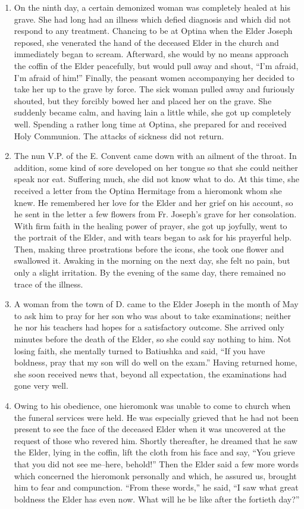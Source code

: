 \begin{enumerate}
\item On the ninth day, a certain demonized woman was completely healed at his grave. She had long had an illness which defied diagnosis and which did not respond to any treatment. Chancing to be at Optina when the Elder Joseph reposed, she venerated the hand of the deceased Elder in the church and immediately began to scream. Afterward, she would by no means approach the coffin of the Elder peacefully, but would pull away and shout, “I'm afraid, I'm afraid of him!” Finally, the peasant women accompanying her decided to take her up to the grave by force. The sick woman pulled away and furiously shouted, but they forcibly bowed her and placed her on the grave. She suddenly became calm, and having lain a little while, she got up completely well. Spending a rather long time at Optina, she prepared for and received Holy Communion. The attacks of sickness did not return.

\item The nun V.P. of the E. Convent came down with an ailment of the throat. In addition, some kind of sore developed on her tongue so that she could neither speak nor eat. Suffering much, she did not know what to do. At this time, she received a letter from the Optina Hermitage from a hieromonk whom she knew. He remembered her love for the Elder and her grief on his account, so he sent in the letter a few flowers from Fr. Joseph's grave for her consolation. With firm faith in the healing power of prayer, she got up joyfully, went to the portrait of the Elder, and with tears began to ask for his prayerful help. Then, making three prostrations before the icons, she took one flower and swallowed it. Awaking in the morning on the next day, she felt no pain, but only a slight irritation. By the evening of the same day, there remained no trace of the illness.

\item A woman from the town of D. came to the Elder Joseph in the month of May to ask him to pray for her son who was about to take examinations; neither he nor his teachers had hopes for a satisfactory outcome. She arrived only minutes before the death of the Elder, so she could say nothing to him. Not losing faith, she mentally turned to Batiushka and said, “If you have boldness, pray that my son will do well on the exam.” Having returned home, she soon received news that, beyond all expectation, the examinations had gone very well.

\item Owing to his obedience, one hieromonk was unable to come to church when the funeral services were held. He was especially grieved that he had not been present to see the face of the deceased Elder when it was uncovered at the request of those who revered him. Shortly thereafter, he dreamed that he saw the Elder, lying in the coffin, lift the cloth from his face and say, “You grieve that you did not see me--here, behold!” Then the Elder said a few more words which concerned the hieromonk personally and which, he assured us, brought him to fear and compunction. “From these words,” he said, “I saw what great boldness the Elder has even now. What will he be like after the fortieth day?”


\end{enumerate}
